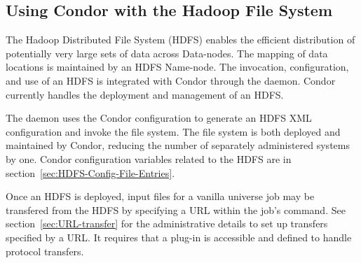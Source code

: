 \subsection{\label{sec:Condor-HDFS}Using Condor with the Hadoop File System}

The Hadoop Distributed File System (HDFS) enables the efficient distribution
of potentially very large sets of data across Data-nodes.
The mapping of data locations is maintained by an HDFS Name-node.
The invocation, configuration, and use of an HDFS is integrated with Condor
through the  daemon.
Condor currently handles the deployment and management of an HDFS.

The  daemon uses the Condor configuration to generate
an HDFS XML configuration and invoke the file system. 
The file system is both deployed and maintained by Condor, 
reducing the number of separately administered systems by one.
Condor configuration variables related to the HDFS are
in section~\ref{sec:HDFS-Config-File-Entries}. 

Once an HDFS is deployed, input files for a vanilla universe job 
may be transfered from the HDFS by specifying a URL within the
job's  command. 
See section~\ref{sec:URL-transfer} for the administrative details
to set up transfers specified by a URL.
It requires that a plug-in is accessible and defined to handle
 protocol transfers. 

